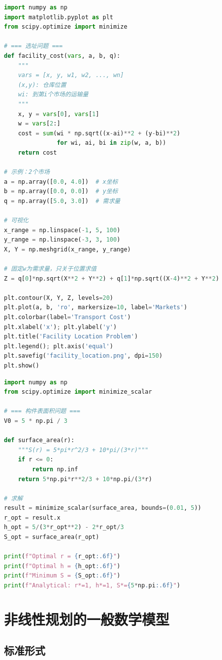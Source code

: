\begin{lstlisting}[language=Python, caption=选址问题可视化]
import numpy as np
import matplotlib.pyplot as plt
from scipy.optimize import minimize

# === 选址问题 ===
def facility_cost(vars, a, b, q):
    """
    vars = [x, y, w1, w2, ..., wn]
    (x,y): 仓库位置
    wi: 到第i个市场的运输量
    """
    x, y = vars[0], vars[1]
    w = vars[2:]
    cost = sum(wi * np.sqrt((x-ai)**2 + (y-bi)**2) 
               for wi, ai, bi in zip(w, a, b))
    return cost

# 示例：2个市场
a = np.array([0.0, 4.0])  # x坐标
b = np.array([0.0, 0.0])  # y坐标
q = np.array([5.0, 3.0])  # 需求量

# 可视化
x_range = np.linspace(-1, 5, 100)
y_range = np.linspace(-3, 3, 100)
X, Y = np.meshgrid(x_range, y_range)

# 固定w为需求量，只关于位置求值
Z = q[0]*np.sqrt(X**2 + Y**2) + q[1]*np.sqrt((X-4)**2 + Y**2)

plt.contour(X, Y, Z, levels=20)
plt.plot(a, b, 'ro', markersize=10, label='Markets')
plt.colorbar(label='Transport Cost')
plt.xlabel('x'); plt.ylabel('y')
plt.title('Facility Location Problem')
plt.legend(); plt.axis('equal')
plt.savefig('facility_location.png', dpi=150)
plt.show()
\end{lstlisting}

\begin{lstlisting}[language=Python, caption=构件表面积优化]
import numpy as np
from scipy.optimize import minimize_scalar

# === 构件表面积问题 ===
V0 = 5 * np.pi / 3

def surface_area(r):
    """S(r) = 5*pi*r^2/3 + 10*pi/(3*r)"""
    if r <= 0:
        return np.inf
    return 5*np.pi*r**2/3 + 10*np.pi/(3*r)

# 求解
result = minimize_scalar(surface_area, bounds=(0.01, 5))
r_opt = result.x
h_opt = 5/(3*r_opt**2) - 2*r_opt/3
S_opt = surface_area(r_opt)

print(f"Optimal r = {r_opt:.6f}")
print(f"Optimal h = {h_opt:.6f}")
print(f"Minimum S = {S_opt:.6f}")
print(f"Analytical: r*=1, h*=1, S*={5*np.pi:.6f}")
\end{lstlisting}

\section{非线性规划的一般数学模型}\label{sec:general-model}

\subsection{标准形式}

